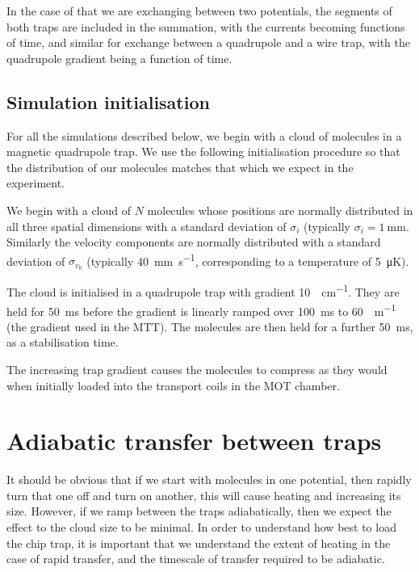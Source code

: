 In the case of that we are exchanging between
two potentials, the segments of both traps are included in the summation, with
the currents becoming functions of time, and similar for exchange between a
quadrupole and a wire trap, with the quadrupole gradient being a function of
time.


\subsection{Simulation initialisation}
\label{design:sim:init}

For all the simulations described below, we begin with a cloud of molecules in
a magnetic quadrupole trap. We use the following initialisation procedure so
that the distribution of our molecules matches that which we expect in the
experiment. 

We begin with a cloud of $N$ molecules whose positions are normally distributed
in all three spatial dimensions with a standard deviation of $\sigma_i$
(typically $\sigma_i = \SI{1}{\milli\meter}$. Similarly the velocity components
are normally distributed with a standard deviation of $\sigma_{v_0}$ (typically
\SI{40}{\milli\meter\per\second}, corresponding to a temperature of
\SI{5}{\micro\kelvin}). 

The cloud is initialised in a quadrupole trap with gradient
\SI{10}{\gauss\per\centi\meter}. They are held for \SI{50}{\milli\second}
before the gradient is linearly ramped over \SI{100}{\milli\second} to
\SI{60}{\gauss\per\meter} (the gradient used in the MTT).
The molecules are then held for a further \SI{50}{\milli\second}, as a
stabilisation time.

The increasing trap gradient causes the molecules to compress as they would
when initially loaded into the transport coils in the MOT chamber.


\section{Adiabatic transfer between traps}

It should be obvious that if we start with molecules in one potential, then
rapidly turn that one off and turn on another, this will cause heating and
increasing its size.  However, if we ramp between the traps adiabatically, then
we expect the effect to the cloud size to be minimal. In order to understand
how best to load the chip trap, it is important that we understand the extent
of heating in the case of rapid transfer, and the timescale of transfer
required to be adiabatic.

